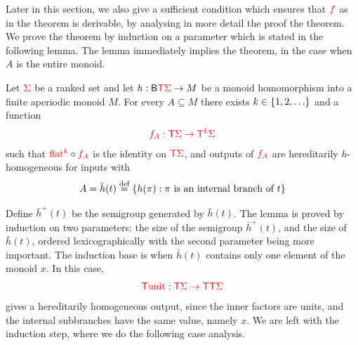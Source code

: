 \newcommand{\hint}{\bar h}
\newcommand{\hintplus}{\bar h^+}
\newcommand{\branchesplus}{\mathsf B^+}
Later in this section, we also give a sufficient condition which ensures that ${\color{red}{f}}$ as in the theorem is derivable, by analysing in more detail the proof the theorem. 
We prove the theorem by induction on a parameter which is stated in the following lemma. The lemma immediately implies  the theorem,   in the case when $A$ is the entire monoid.
\begin{lemma}  Let ${\color{red}{\Sigma}}$ be a  ranked set and let $h : \mathsf{B} {\color{red}{\mathsf T}} {\color{red}{\Sigma}} \to M$ be a monoid homomorphism into a finite aperiodic monoid $M$. For every    $A \subseteq M$ there exists  $k \in \{1,2,\ldots\}$ and  a  function
    \begin{align*}
        {\color{red}{f_{A}: {\color{red}{\mathsf T}}{\color{red}{\Sigma}}\to {\color{red}{\mathsf T}}^k {\color{red}{\Sigma}}}}  
    \end{align*}
    such that ${\color{red}{\mathrm{flat}}}^{{\color{red}{k}}} \circ {\color{red}{f_A}}$ is the identity on ${\color{red}{\mathsf T}} {\color{red}{\Sigma}}$, and   outputs of  ${\color{red}{f_{A}}}$ are hereditarily $h$-homogeneous for inputs with 
    \begin{align*}
        A = \hint(t) \eqdef \set{h(\pi) : \text{$\pi$ is an internal branch of $t$}} 
    \end{align*} 
\end{lemma}
Define $\hintplus(t)$ be the semigroup generated by $\hint(t)$. 
The lemma is 
proved by induction on two parameters: the size of  the semigroup $\hintplus(t)$, and the size of $\hint(t)$, ordered lexicographically with the second parameter being more important. The induction base is when $\hint(t)$ contains only one element of the monoid $x$. In this case, 
\begin{align*}
{\color{red}{{\color{red}{\mathsf T}}{\color{red}{\mathrm{unit}}}: {\color{red}{\mathsf T}}\Sigma \to {\color{red}{\mathsf T}}{\color{red}{\mathsf T}}\Sigma}}
\end{align*}
gives a hereditarily homogeneous output, since the inner factors are units, and the internal subbranches have the same value, namely $x$. We are left with the induction step, where we do the following case analysis.

